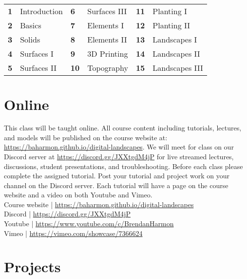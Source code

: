 \documentclass[11pt,article,oneside]{memoir}
\begin{document}
\begin{table}[H]
\begin{tabular}{l l @{\hskip 0.5cm} l l @{\hskip 0.5cm} l l}
\small
\textbf{1} & Introduction & \textbf{6} & Surfaces III & \textbf{11} & Planting I\\
\textbf{2} & Basics & \textbf{7} & Elements I & \textbf{12} & Planting II\\
\textbf{3} & Solids & \textbf{8} & Elements II & \textbf{13} & Landscapes I\\
\textbf{4} & Surfaces I & \textbf{9} & 3D Printing & \textbf{14} & Landscapes II\\
\textbf{5} & Surfaces II & \textbf{10} & Topography & \textbf{15} & Landscapes III \\
\end{tabular}
\end{table}


\section{Online}

This class will be taught online.
All course content including tutorials, lectures, and models
will be published on the course website at:
\url{https://baharmon.github.io/digital-landscapes}.
We will meet for class on 
our Discord server at \url{https://discord.gg/JXXtgdM4jP}
for live streamed lectures, discussions, student presentations, and troubleshooting. 
Before each class please complete the assigned tutorial. 
Post your tutorial and project work 
on your channel on the Discord server. 
Each tutorial will have a page on the course website
and a video on both Youtube and Vimeo. \\

\noindent
Course website | \url{https://baharmon.github.io/digital-landscapes}\\
Discord | \url{https://discord.gg/JXXtgdM4jP}\\
Youtube | \url{https://www.youtube.com/c/BrendanHarmon}\\
Vimeo | \url{https://vimeo.com/showcase/7366624}\\

\section{Projects}
\end{document}
